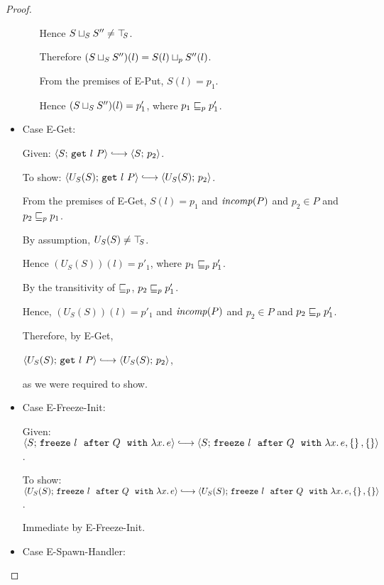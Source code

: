 \begin{proof}
\begin{itemize}
\begin{itemize}
          Hence $S \sqcup_{S} S'' \neq \top\hspace{-0.85mm}_{S}$.

          Therefore $(S \sqcup_{S} S'')(l) = S(l) \sqcup_p S''(l)$.

          From the premises of {\sc E-Put}, $S(l) = p_1$.

          Hence $(S \sqcup_{S} S'')(l) = p'_1$, where $p_1 \sqsubseteq_p
          p'_1$.


      \end{itemize}

    \item Case {\sc E-Get}:

      Given: $\config{S}{\getexp{l}{P}} \parstepsto \config{S}{p_2}$.

      To show: $\config{U_S(S)}{\getexp{l}{P}} \parstepsto
      \config{U_S(S)}{p_2}$.

      From the premises of {\sc E-Get}, $S(l) = p_1$ and $\mathit{incomp}(P)$
      and $p_2 \in P$ and $p_2 \sqsubseteq_p p_1$.

      By assumption, $U_S(S) \neq \top\hspace{-0.85mm}_{S}$.

      Hence $(U_S(S))(l) = p'_1$, where $p_1 \sqsubseteq_p p'_1$.

      By the transitivity of $\sqsubseteq_p$, $p_2 \sqsubseteq_p p'_1$.

      Hence, $(U_S(S))(l) = p'_1$ and $\mathit{incomp}(P)$ and $p_2 \in P$ and
      $p_2 \sqsubseteq_p p'_1$.

      Therefore, by {\sc E-Get},

      $\config{U_S(S)}{\getexp{l}{P}} \parstepsto
      \config{U_S(S)}{p_2}$,

      as we were required to show.

    \item Case {\sc E-Freeze-Init}:

      Given: $\config{S}{\freezeafter{l}{Q}{\lam{x}{e}}} \parstepsto
      \config{S}{\freezeafterfull{l}{Q}{\lam{x}{e}}{\setof{}}{\setof{}}}$.

      To show: $\config{U_S(S)}{\freezeafter{l}{Q}{\lam{x}{e}}}
      \parstepsto
      \config{U_S(S)}{\freezeafterfull{l}{Q}{\lam{x}{e}}{\setof{}}{\setof{}}}$.

      Immediate by {\sc E-Freeze-Init}.

    \item Case {\sc E-Spawn-Handler}:



\end{itemize}
\end{proof}
